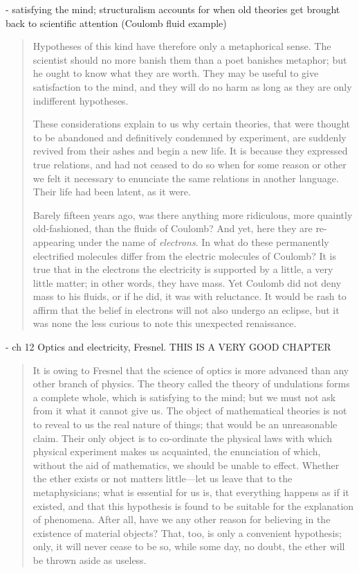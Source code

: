   - satisfying the mind; structuralism accounts for when old theories get brought back to scientific attention (Coulomb fluid example)
 
 \begin{quote}
     Hypotheses of this kind have therefore only a metaphorical sense.  The scientist should no more banish them than a poet banishes metaphor; but he ought to know what they are worth.  They may be useful to give satisfaction to the mind, and they will do no harm as long as they are only indifferent hypotheses.  
     
     These considerations explain to us why certain theories, that were thought to be abandoned and definitively condemned by experiment, are suddenly revived from their ashes and begin a new life.  It is because they expressed true relations, and had not ceased to do so when for some reason or other we felt it necessary to enunciate the same relations in another language.  Their life had been latent, as it were.  
     
     Barely fifteen years ago, was there anything more ridiculous, more quaintly old-fashioned, than the fluids of Coulomb?  And yet, here they are re-appearing under the name of \emph{electrons}.  In what do these permanently electrified molecules differ from the electric molecules of Coulomb?  It is true that in the electrons the electricity is supported by a little, a very little matter; in other words, they have mass.  Yet Coulomb did not deny mass to his fluids, or if he did, it was with reluctance.  It would be rash to affirm that the belief in electrons will not also undergo an eclipse, but it was none the less curious to note this unexpected renaissance.
     
     \citep[p. 164-165]{Poincare1952}
 \end{quote}


- ch 12 Optics and electricity, Fresnel.  THIS IS A VERY GOOD CHAPTER
 
\begin{quote}
    It is owing to Fresnel that the science of optics is more advanced than any other branch of physics.  The theory called the theory of undulations forms a complete whole, which is satisfying to the mind; but we must not ask from it what it cannot give us.  The object of mathematical theories is not to reveal to us the real nature of things; that would be an unreasonable claim.  Their only object is to co-ordinate the physical laws with which physical experiment makes us acquainted, the enunciation of which, without the aid of mathematics, we should be unable to effect.  Whether the ether exists or not matters little---let us leave that to the metaphysicians; what is essential for us is, that everything happens as if it existed, and that this hypothesis is found to be suitable for the explanation of phenomena.  After all, have we any other reason for believing in the existence of material objects?  That, too, is only a convenient hypothesis; only, it will never cease to be so, while some day, no doubt, the ether will be thrown aside as useless.
    
    \citep[p. 211-212]{Poincare1952}
\end{quote}

